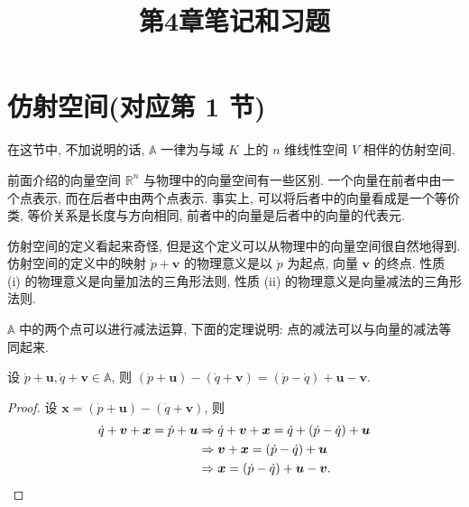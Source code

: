\documentclass{ctexart}
\title{第4章笔记和习题}
\begin{document}
\maketitle
\section{仿射空间(对应第 1 节)}
在这节中, 不加说明的话, $\mathbb{A}$ 一律为与域 $K$ 上的 $n$ 维线性空间 $V$ 相伴的仿射空间.

前面介绍的向量空间 $\mathbb{R}^n$ 与物理中的向量空间有一些区别. 一个向量在前者中由一个点表示, 而在后者中由两个点表示. 事实上, 可以将后者中的向量看成是一个等价类, 等价关系是长度与方向相同, 前者中的向量是后者中的向量的代表元.

仿射空间的定义看起来奇怪, 但是这个定义可以从物理中的向量空间很自然地得到. 仿射空间的定义中的映射 $\dot{p}+\boldsymbol{v}$ 的物理意义是以 $\dot{p}$ 为起点, 向量 $\boldsymbol{v}$ 的终点. 性质 (i) 的物理意义是向量加法的三角形法则, 性质 (ii) 的物理意义是向量减法的三角形法则.

$\mathbb{A}$ 中的两个点可以进行减法运算, 下面的定理说明: 点的减法可以与向量的减法等同起来.
\begin{theorem}
    设 $\dot{p}+\boldsymbol{u},\dot{q}+\boldsymbol{v}\in\mathbb{A}$, 则 $(\dot{p}+\boldsymbol{u})-(\dot{q}+\boldsymbol{v})=(\dot{p}-\dot{q})+\boldsymbol{u}-\boldsymbol{v}$.
\end{theorem}
\begin{proof}
    设 $\boldsymbol{x}=(\dot{p}+\boldsymbol{u})-(\dot{q}+\boldsymbol{v})$, 则
    \begin{align*}
        \dot{q}+\boldsymbol{v}+\boldsymbol{x}=\dot{p}+\boldsymbol{u} & \Rightarrow\dot{q}+\boldsymbol{v}+\boldsymbol{x}=\dot{q}+(\dot{p}-\dot{q})+\boldsymbol{u} \\
        & \Rightarrow\boldsymbol{v}+\boldsymbol{x}=(\dot{p}-\dot{q})+\boldsymbol{u} \\
        & \Rightarrow\boldsymbol{x}=(\dot{p}-\dot{q})+\boldsymbol{u}-\boldsymbol{v}.\qedhere
    \end{align*}
\end{proof}
\end{document}
